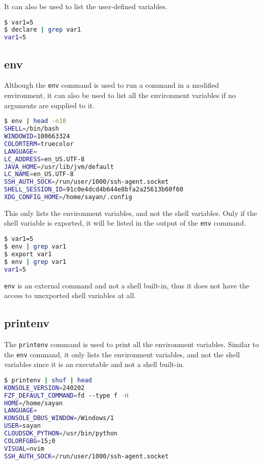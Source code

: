 It can also be used to list the user-defined variables.

\begin{lstlisting}[language=bash]
$ var1=5
$ declare | grep var1
var1=5
\end{lstlisting}

\subsection{env}

Although the \lstinline{env} command is used to run a command in a modified environment, it can also be used to list all the environment variables if no arguments are supplied to it.

\begin{lstlisting}[language=bash]
$ env | head -n10
SHELL=/bin/bash
WINDOWID=100663324
COLORTERM=truecolor
LANGUAGE=
LC_ADDRESS=en_US.UTF-8
JAVA_HOME=/usr/lib/jvm/default
LC_NAME=en_US.UTF-8
SSH_AUTH_SOCK=/run/user/1000/ssh-agent.socket
SHELL_SESSION_ID=91c0e4dcd4b644e8bfa2a25613b60f60
XDG_CONFIG_HOME=/home/sayan/.config
\end{lstlisting}

This only lists the environment variables, and not the shell variables.
Only if the shell variable is exported, it will be listed in the output of the \lstinline{env} command.

\begin{lstlisting}[language=bash]
$ var1=5
$ env | grep var1
$ export var1
$ env | grep var1
var1=5
\end{lstlisting}

\lstinline|env| is an external command and not a shell built-in, thus it does not have the access to unexported shell variables at all.

\subsection{printenv}

The \lstinline{printenv} command is used to print all the environment variables.
Similar to the \lstinline{env} command, it only lists the environment variables, and not the shell variables since it is an executable and not a shell built-in.

\begin{lstlisting}[language=bash]
$ printenv | shuf | head
KONSOLE_VERSION=240202
FZF_DEFAULT_COMMAND=fd --type f -H
HOME=/home/sayan
LANGUAGE=
KONSOLE_DBUS_WINDOW=/Windows/1
USER=sayan
CLOUDSDK_PYTHON=/usr/bin/python
COLORFGBG=15;0
VISUAL=nvim
SSH_AUTH_SOCK=/run/user/1000/ssh-agent.socket
\end{lstlisting}

